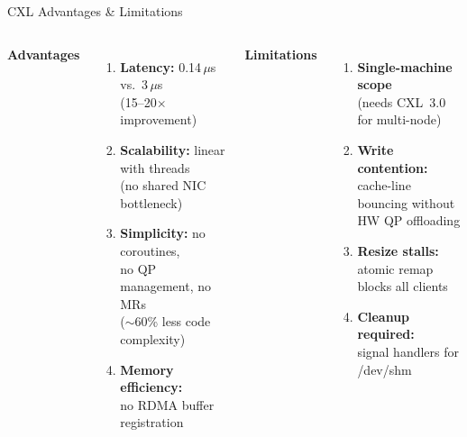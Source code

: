 \documentclass[aspectratio=169]{beamer}
\begin{document}
\begin{frame}{CXL Advantages \& Limitations}
\begin{columns}[T]
\textcolor{numacolor}{\textbf{Advantages}}
\begin{enumerate}
  \item \textbf{Latency:} 0.14\,$\mu$s vs.\ 3\,$\mu$s\\
        (15--20$\times$ improvement)
  \medskip
  \item \textbf{Scalability:} linear with threads\\
        (no shared NIC bottleneck)
  \medskip
  \item \textbf{Simplicity:} no coroutines,\\
        no QP management, no MRs\\
        ($\sim$60\% less code complexity)
  \medskip
  \item \textbf{Memory efficiency:}\\
        no RDMA buffer registration
\end{enumerate}

\textcolor{rdmacolor}{\textbf{Limitations}}
\begin{enumerate}
  \item \textbf{Single-machine scope}\\
        (needs CXL~3.0 for multi-node)
  \medskip
  \item \textbf{Write contention:}\\
        cache-line bouncing without\\
        HW QP offloading
  \medskip
  \item \textbf{Resize stalls:}\\
        atomic remap blocks all clients
  \medskip
  \item \textbf{Cleanup required:}\\
        signal handlers for /dev/shm
\end{enumerate}
\end{columns}
\end{frame}
\end{document}
